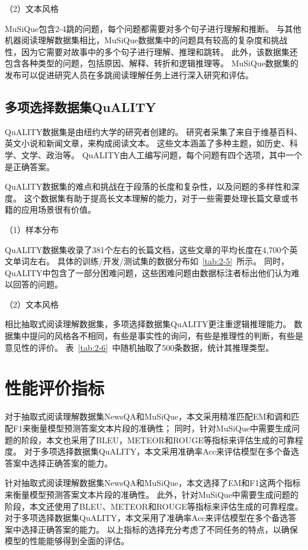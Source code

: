 （2）文本风格

MuSiQue包含2-4跳的问题，每个问题都需要对多个句子进行理解和推断。
与其他机器阅读理解数据集相比，MuSiQue数据集中的问题具有较高的复杂度和挑战性，因为它需要对故事中的多个句子进行理解、推理和跳转。
此外，该数据集还包含各种类型的问题，包括原因、解释、转折和逻辑推理等。
MuSiQue数据集的发布可以促进研究人员在多跳阅读理解任务上进行深入研究和评估。

\subsection{多项选择数据集QuALITY}
QuALITY数据集是由纽约大学的研究者创建的。
研究者采集了来自于维基百科、英文小说和新闻文章，来构成阅读文本。
这些文本涵盖了多种主题，如历史、科学、文学、政治等。
QuALITY由人工编写问题，每个问题有四个选项，其中一个是正确答案。

QuALITY数据集的难点和挑战在于段落的长度和复杂性，以及问题的多样性和深度。
这个数据集有助于提高长文本理解的能力，对于一些需要处理长篇文章或书籍的应用场景很有价值。

（1）样本分布

QuALITY数据集收录了381个左右的长篇文档，这些文章的平均长度在4,700个英文单词左右。
具体的训练/开发/测试集的数据分布如~\ref{tab:2-5}~所示。
同时，QuALITY中包含了一部分困难问题，这些困难问题由数据标注者标出他们认为难以回答的问题。



（2）文本风格

相比抽取式阅读理解数据集，多项选择数据集QuALITY更注重逻辑推理能力。
数据集中提问的风格各不相同，有些是事实性的询问，有些是推理性的判断，有些是意见性的评价。
表~\ref{tab:2-6}~中随机抽取了500条数据，统计其推理类型。



\section{性能评价指标}
对于抽取式阅读理解数据集NewsQA和MuSiQue，本文采用精准匹配EM和调和匹配F1来衡量模型预测答案文本片段的准确性；
同时，针对MuSiQue中需要生成问题的阶段，本文也采用了BLEU，METEOR和ROUGE等指标来评估生成的可靠程度。
对于多项选择数据集QuALITY，本文采用准确率Acc来评估模型在多个备选答案中选择正确答案的能力。

针对抽取式阅读理解数据集NewsQA和MuSiQue，本文选择了EM和F1这两个指标来衡量模型预测答案文本片段的准确性。
此外，针对MuSiQue中需要生成问题的阶段，本文还使用了BLEU、METEOR和ROUGE等指标来评估生成的可靠程度。
对于多项选择数据集QuALITY，本文采用了准确率Acc来评估模型在多个备选答案中选择正确答案的能力。
以上指标的选择充分考虑了不同任务的特点，以确保模型的性能能够得到全面的评估。

